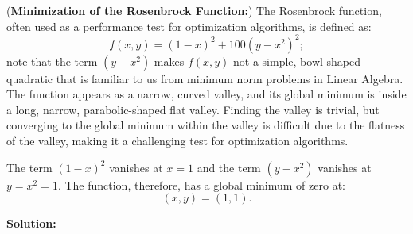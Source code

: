 \bigskip


\begin{example} (\textbf{Minimization of the Rosenbrock Function:}) The Rosenbrock function, often used as a performance test for optimization algorithms, is defined as:
$$f(x, y) = (1 - x)^2 + 100(y - x^2)^2; $$
note that the term $(y-x^2)$ makes $f(x,y)$ not a simple, bowl-shaped quadratic that is familiar to us from minimum norm problems in Linear Algebra. The function appears as a narrow, curved valley, and its global minimum is inside a long, narrow, parabolic-shaped flat valley. Finding the valley is trivial, but converging to the global minimum within the valley is difficult due to the flatness of the valley, making it a challenging test for optimization algorithms.

The term $(1-x)^2$ vanishes at $x=1$ and the term $(y-x^2)$ vanishes at $y=x^2 = 1$. The function, therefore, has a global minimum of zero at:
$$(x, y) = (1, 1). $$
    
\end{example}

\textbf{Solution:}


